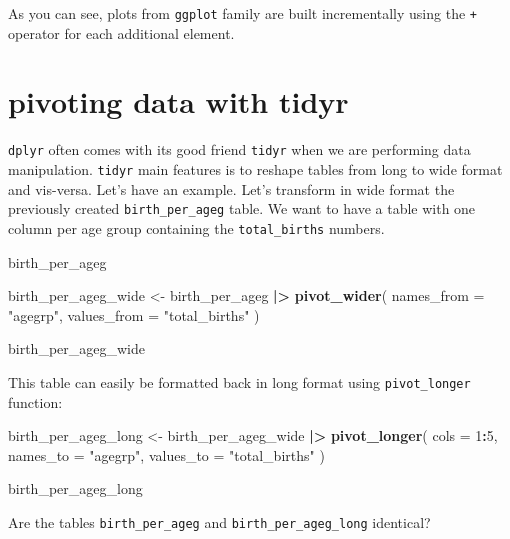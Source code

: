 \documentclass[
]{book}
\newenvironment{Shaded}{\begin{snugshade}}{\end{snugshade}}
\newcommand{\AttributeTok}[1]{\textcolor[rgb]{0.13,0.29,0.53}{#1}}
\newcommand{\DecValTok}[1]{\textcolor[rgb]{0.00,0.00,0.81}{#1}}
\newcommand{\FunctionTok}[1]{\textcolor[rgb]{0.13,0.29,0.53}{\textbf{#1}}}
\newcommand{\NormalTok}[1]{#1}
\newcommand{\OtherTok}[1]{\textcolor[rgb]{0.56,0.35,0.01}{#1}}
\newcommand{\SpecialCharTok}[1]{\textcolor[rgb]{0.81,0.36,0.00}{\textbf{#1}}}
\newcommand{\StringTok}[1]{\textcolor[rgb]{0.31,0.60,0.02}{#1}}
\begin{document}
As you can see, plots from \texttt{ggplot} family are built incrementally using the \texttt{+} operator for each additional element.

\section{pivoting data with tidyr}\label{pivoting-data-with-tidyr}

\texttt{dplyr} often comes with its good friend \texttt{tidyr} when we are performing data manipulation. \texttt{tidyr} main features is to reshape tables from long to wide format and vis-versa. Let's have an example.
Let's transform in wide format the previously created \texttt{birth\_per\_ageg} table.
We want to have a table with one column per age group containing the \texttt{total\_births} numbers.

\begin{Shaded}
\begin{Highlighting}[]
\NormalTok{birth\_per\_ageg}

\NormalTok{birth\_per\_ageg\_wide }\OtherTok{\textless{}{-}}
\NormalTok{  birth\_per\_ageg }\SpecialCharTok{|\textgreater{}}
  \FunctionTok{pivot\_wider}\NormalTok{(}
    \AttributeTok{names\_from =} \StringTok{"agegrp"}\NormalTok{, }
    \AttributeTok{values\_from =} \StringTok{"total\_births"}
\NormalTok{  )}

\NormalTok{birth\_per\_ageg\_wide}
\end{Highlighting}
\end{Shaded}

This table can easily be formatted back in long format using \texttt{pivot\_longer} function:

\begin{Shaded}
\begin{Highlighting}[]
\NormalTok{birth\_per\_ageg\_long }\OtherTok{\textless{}{-}}
\NormalTok{  birth\_per\_ageg\_wide }\SpecialCharTok{|\textgreater{}}
  \FunctionTok{pivot\_longer}\NormalTok{(}
    \AttributeTok{cols =} \DecValTok{1}\SpecialCharTok{:}\DecValTok{5}\NormalTok{, }
    \AttributeTok{names\_to =} \StringTok{"agegrp"}\NormalTok{, }
    \AttributeTok{values\_to =} \StringTok{"total\_births"}
\NormalTok{  )}

\NormalTok{birth\_per\_ageg\_long}
\end{Highlighting}
\end{Shaded}

Are the tables \texttt{birth\_per\_ageg} and \texttt{birth\_per\_ageg\_long} identical?
\end{document}
